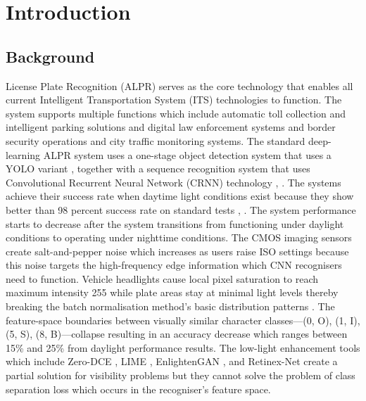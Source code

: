\documentclass[preprint,12pt]{elsarticle}
\begin{document}
\section{Introduction}
\label{sec:introduction}

\subsection{Background}
 License Plate Recognition (ALPR) serves as the core technology that enables all current Intelligent Transportation System (ITS) technologies to function. The system supports multiple functions which include automatic toll collection and intelligent parking solutions and digital law enforcement systems and border security operations and city traffic monitoring systems. The standard deep-learning ALPR system uses a one-stage object detection system that uses a YOLO variant \cite{b15}, \cite{b16} together with a sequence recognition system that uses Convolutional Recurrent Neural Network (CRNN) technology \cite{b12}, \cite{b14}. The systems achieve their success rate when daytime light conditions exist because they show better than 98 percent success rate on standard tests \cite{b13}, \cite{b14}. The system performance starts to decrease after the system transitions from functioning under daylight conditions to operating under nighttime conditions. The CMOS imaging sensors create salt-and-pepper noise which increases as users raise ISO settings because this noise targets the high-frequency edge information which CNN recognisers need to function. Vehicle headlights cause local pixel saturation to reach maximum intensity 255 while plate areas stay at minimal light levels thereby breaking the batch normalisation method's basic distribution patterns \cite{b37}. The feature-space boundaries between visually similar character classes---(0, O), (1, I), (5, S), (8, B)---collapse resulting in an accuracy decrease which ranges between 15\% and 25\% from daylight performance results. The low-light enhancement tools which include Zero-DCE \cite{b2}, LIME \cite{b19}, EnlightenGAN \cite{b20}, and Retinex-Net \cite{b21} create a partial solution for visibility problems but they cannot solve the problem of class separation loss which occurs in the recogniser's feature space.
\end{document}
